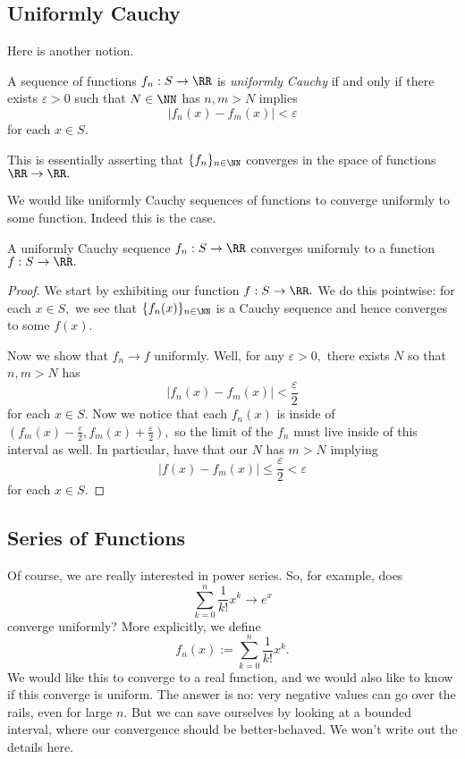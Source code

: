 \documentclass[../notes.tex]{subfiles}
\begin{document}
\subsection{Uniformly Cauchy}
Here is another notion.
\begin{definition}
	A sequence of functions $f_n:S\to\RR$ is \textit{uniformly Cauchy} if and only if there exists $\varepsilon>0$ such that $N\in\NN$ has $n,m>N$ implies
	\[|f_n(x)-f_m(x)|<\varepsilon\]
	for each $x\in S.$
\end{definition}
\begin{remark}
	This is essentially asserting that $\{f_n\}_{n\in\NN}$ converges in the space of functions $\RR\to\RR.$
\end{remark}
We would like uniformly Cauchy sequences of functions to converge uniformly to some function. Indeed this is the case.
\begin{prop}
	A uniformly Cauchy sequence $f_n:S\to\RR$ converges uniformly to a function $f:S\to\RR.$
\end{prop}
\begin{proof}
	We start by exhibiting our function $f:S\to\RR.$ We do this pointwise: for each $x\in S,$ we see that $\{f_n(x)\}_{n\in\NN}$ is a Cauchy sequence and hence converges to some $f(x).$

	Now we show that $f_n\to f$ uniformly. Well, for any $\varepsilon>0,$ there exists $N$ so that $n,m>N$ has
	\[|f_n(x)-f_m(x)|<\frac\varepsilon2\]
	for each $x\in S.$ Now we notice that each $f_n(x)$ is inside of $\left(f_m(x)-\frac{\varepsilon}{2},f_m(x)+\frac{\varepsilon}{2}\right),$ so the limit of the $f_n$ must live inside of this interval as well. In particular, have that our $N$ has $m>N$ implying
	\[|f(x)-f_m(x)|\le\frac{\varepsilon}{2}<\varepsilon\]
	for each $x\in S.$
\end{proof}

\subsection{Series of Functions}
Of course, we are really interested in power series. So, for example, does
\[\sum_{k=0}^n\frac1{k!}x^k\to e^x\]
converge uniformly? More explicitly, we define
\[f_n(x):=\sum_{k=0}^n\frac1{k!}x^k.\]
We would like this to converge to a real function, and we would also like to know if this converge is uniform. The answer is no: very negative values can go over the rails, even for large $n.$ But we can save ourselves by looking at a bounded interval, where our convergence should be better-behaved. We won't write out the details here.
\end{document}
